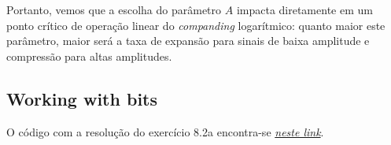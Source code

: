 \documentclass[a4paper]{article}
\begin{document}
Portanto, vemos que a escolha do parâmetro $A$ impacta diretamente em um ponto crítico de operação linear do \textit{companding} logarítmico: quanto maior este parâmetro, maior será a taxa de expansão para sinais de baixa amplitude e compressão para altas amplitudes.

\subsection{Working with bits}

O código com a resolução do exercício 8.2a encontra-se \href{https://github.com/guedes-joaofelipe/CPE793-topics-in-audio-codification/blob/main/exercises/chap02/exercises_chap02.ipynb}{\textit{neste link}}.

%
\end{document}
